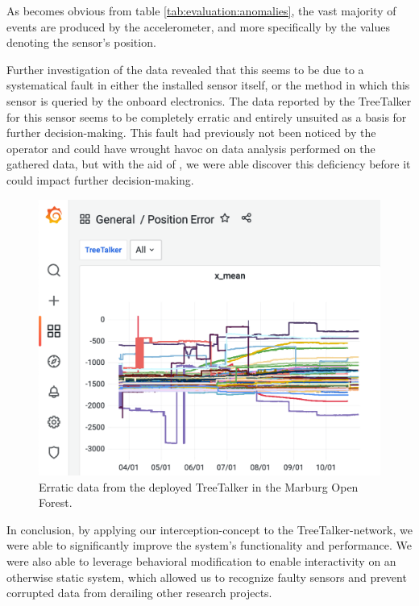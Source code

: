 As becomes obvious from table \ref{tab:evaluation:anomalies}, the vast majority of events are produced by the accelerometer, and more specifically by the values denoting the sensor's position.

Further investigation of the data revealed that this seems to be due to a systematical fault in either the installed sensor itself, or the method in which this sensor is queried by the onboard electronics.
The data reported by the TreeTalker for this sensor seems to be completely erratic and entirely unsuited as a basis for further decision-making.
This fault had previously not been noticed by the operator and could have wrought havoc on data analysis performed on the gathered data, but with the aid of \ttt, we were able discover this deficiency before it could impact further decision-making.

\begin{figure}
    \centering
    \includegraphics[width=\linewidth]{figures/TTT_position_data_smallest.png}
    \caption{Erratic data from the deployed TreeTalker in the Marburg Open Forest.}
    \label{fig:ttt_position_error}
\end{figure}

In conclusion, by applying our interception-concept to the TreeTalker-network, we were able to significantly improve the system's functionality and performance.
We were also able to leverage behavioral modification to enable interactivity on an otherwise static system, which allowed us to recognize faulty sensors and prevent corrupted data from derailing other research projects.
